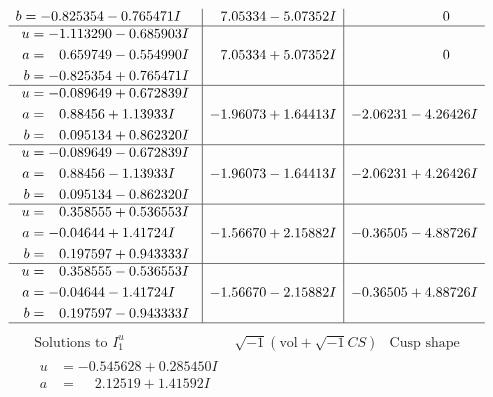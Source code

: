 \documentclass[1p]{elsarticle_modified}
\theoremstyle{definition}
\newcommand{\I}{\sqrt{-1}}
\begin{document}
$$\begin{array}{c|c|c}
\begin{aligned}
b &= -0.825354 - 0.765471 I\end{aligned}
 & \phantom{-}7.05334 - 5.07352 I & \phantom{-0.000000 } 0 \\ \hline\begin{aligned}
u &= -1.113290 - 0.685903 I \\
a &= \phantom{-}0.659749 - 0.554990 I \\
b &= -0.825354 + 0.765471 I\end{aligned}
 & \phantom{-}7.05334 + 5.07352 I & \phantom{-0.000000 } 0 \\ \hline\begin{aligned}
u &= -0.089649 + 0.672839 I \\
a &= \phantom{-}0.88456 + 1.13933 I \\
b &= \phantom{-}0.095134 + 0.862320 I\end{aligned}
 & -1.96073 + 1.64413 I & -2.06231 - 4.26426 I \\ \hline\begin{aligned}
u &= -0.089649 - 0.672839 I \\
a &= \phantom{-}0.88456 - 1.13933 I \\
b &= \phantom{-}0.095134 - 0.862320 I\end{aligned}
 & -1.96073 - 1.64413 I & -2.06231 + 4.26426 I \\ \hline\begin{aligned}
u &= \phantom{-}0.358555 + 0.536553 I \\
a &= -0.04644 + 1.41724 I \\
b &= \phantom{-}0.197597 + 0.943333 I\end{aligned}
 & -1.56670 + 2.15882 I & -0.36505 - 4.88726 I \\ \hline\begin{aligned}
u &= \phantom{-}0.358555 - 0.536553 I \\
a &= -0.04644 - 1.41724 I \\
b &= \phantom{-}0.197597 - 0.943333 I\end{aligned}
 & -1.56670 - 2.15882 I & -0.36505 + 4.88726 I\\
 \hline 
 \end{array}$$\newpage$$\begin{array}{c|c|c}  
\text{Solutions to }I^u_{1}& \I (\text{vol} + \sqrt{-1}CS) & \text{Cusp shape}\\
 \hline 
\begin{aligned}
u &= -0.545628 + 0.285450 I \\
a &= \phantom{-}2.12519 + 1.41592 I \\

\end{aligned}
\end{array}$$
\end{document}
